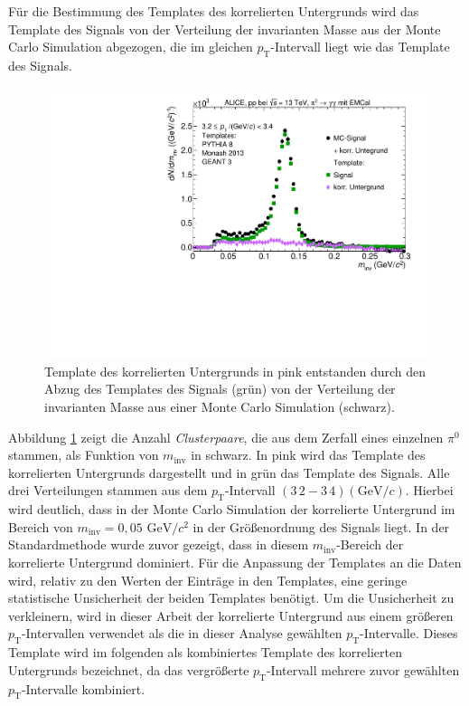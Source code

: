 Für die Bestimmung des Templates des korrelierten Untergrunds wird das Template des Signals von der Verteilung der invarianten Masse aus der Monte Carlo Simulation abgezogen, die im gleichen $p_\text{T}$-Intervall liegt wie das Template des Signals.
\begin{figure}[tp]
\centering
\includegraphics[width=.75\linewidth]{EntstehungUntergrund10_Data_2016.pdf}
\caption{Template des korrelierten Untergrunds in pink entstanden durch den Abzug des Templates des Signals (grün) von der Verteilung der invarianten Masse aus einer Monte Carlo Simulation (schwarz).}
\label{fig:BkgTemp}
\end{figure}
\newline
Abbildung \ref{fig:BkgTemp} zeigt die Anzahl \textit{Clusterpaare}, die aus dem Zerfall eines einzelnen $\pi^{0}$ stammen, als Funktion von $m_\text{inv}$ in schwarz.
In pink wird das Template des korrelierten Untergrunds dargestellt und in grün das Template des Signals.
Alle drei Verteilungen stammen aus dem $p_\text{T}$-Intervall $(3\,2 - 3\,4) (\text{GeV/}c)$.
Hierbei wird deutlich, dass in der Monte Carlo Simulation der korrelierte Untergrund im Bereich von $m_\text{inv} = 0,05 \text{ GeV/}c^{2}$ in der Größenordnung des Signals liegt.
In der Standardmethode wurde zuvor gezeigt, dass in diesem $m_\text{inv}$-Bereich der korrelierte Untergrund dominiert.
\newline
Für die Anpassung der Templates an die Daten wird, relativ zu den Werten der Einträge in den Templates, eine geringe statistische Unsicherheit der beiden Templates benötigt.
Um die Unsicherheit zu verkleinern, wird in dieser Arbeit der korrelierte Untergrund aus einem größeren $p_\text{T}$-Intervallen verwendet als die in dieser Analyse gewählten $p_\text{T}$-Intervalle.
Dieses Template wird im folgenden als kombiniertes Template des korrelierten Untergrunds bezeichnet, da das vergrößerte $p_\text{T}$-Intervall mehrere zuvor gewählten $p_\text{T}$-Intervalle kombiniert.
